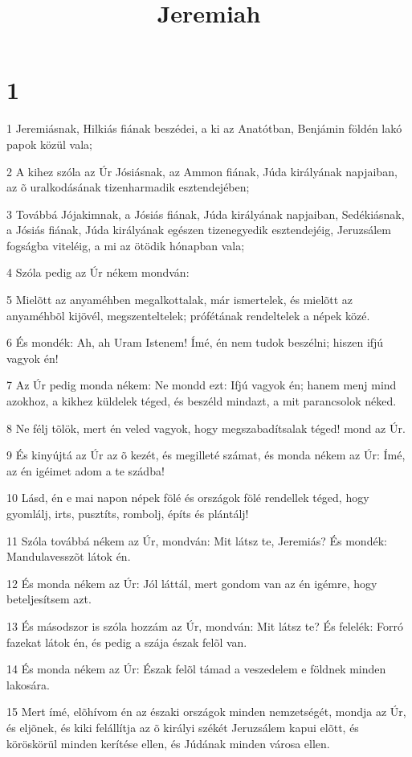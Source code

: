 

\title{Jeremiah}


\chapter{1}

\par 1 Jeremiásnak, Hilkiás fiának beszédei, a ki az Anatótban, Benjámin földén lakó papok közül vala;
\par 2 A kihez szóla az Úr Jósiásnak, az Ammon fiának, Júda királyának napjaiban, az õ uralkodásának tizenharmadik esztendejében;
\par 3 Továbbá Jójakimnak, a Jósiás fiának, Júda királyának  napjaiban, Sedékiásnak, a Jósiás fiának, Júda királyának egészen tizenegyedik esztendejéig, Jeruzsálem fogságba viteléig, a mi az ötödik hónapban vala;
\par 4 Szóla pedig az Úr nékem mondván:
\par 5 Mielõtt az anyaméhben megalkottalak, már ismertelek, és mielõtt az anyaméhbõl kijövél, megszenteltelek; prófétának rendeltelek a népek közé.
\par 6 És mondék: Ah, ah Uram Istenem! Ímé, én nem tudok beszélni; hiszen ifjú vagyok én!
\par 7 Az Úr pedig monda nékem: Ne mondd ezt: Ifjú vagyok én; hanem menj mind azokhoz, a kikhez küldelek téged, és beszéld mindazt, a mit parancsolok néked.
\par 8 Ne félj tõlök, mert én veled vagyok, hogy megszabadítsalak téged! mond az Úr.
\par 9 És kinyújtá az Úr az õ kezét, és megilleté számat, és monda nékem az Úr: Ímé, az én igéimet adom a te szádba!
\par 10 Lásd, én e mai napon népek fölé és országok fölé rendellek téged, hogy gyomlálj, irts, pusztíts, rombolj, építs és plántálj!
\par 11 Szóla továbbá nékem az Úr, mondván: Mit látsz te, Jeremiás? És mondék: Mandulavesszõt látok én.
\par 12 És monda nékem az Úr: Jól láttál, mert gondom van az én igémre, hogy beteljesítsem azt.
\par 13 És másodszor is szóla hozzám az Úr, mondván: Mit látsz te? És felelék: Forró fazekat látok én, és pedig a szája észak felõl van.
\par 14 És monda nékem az Úr: Észak felõl támad a veszedelem e földnek minden lakosára.
\par 15 Mert ímé, elõhívom én az északi országok minden nemzetségét, mondja az Úr, és eljõnek, és kiki felállítja az õ királyi székét Jeruzsálem kapui elõtt, és köröskörül minden kerítése ellen, és Júdának minden városa ellen.
